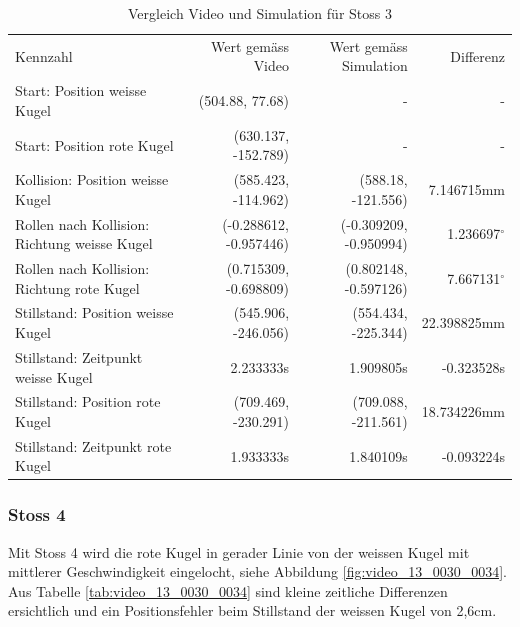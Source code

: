 \begin{table}[ht]
    \begin{tabular}{ lrrr }
        \rowcolor{\seccolor!50}
        Kennzahl & Wert gemäss Video & Wert gemäss Simulation & Differenz \\
        Start: Position weisse Kugel & (504.88, 77.68) & - & -\\
        Start: Position rote Kugel & (630.137, -152.789) & - & -\\
        Kollision: Position weisse Kugel & (585.423, -114.962) & (588.18, -121.556) & 7.146715mm\\
        Rollen nach Kollision: Richtung weisse Kugel & (-0.288612, -0.957446) & (-0.309209, -0.950994) & 1.236697$^{\circ}$ \\
        Rollen nach Kollision: Richtung rote Kugel & (0.715309, -0.698809) & (0.802148, -0.597126) & 7.667131$^{\circ}$ \\
        Stillstand: Position weisse Kugel & (545.906, -246.056) & (554.434, -225.344) & 22.398825mm\\
        Stillstand: Zeitpunkt weisse Kugel & 2.233333s & 1.909805s & -0.323528s\\
        Stillstand: Position rote Kugel & (709.469, -230.291) & (709.088, -211.561) & 18.734226mm\\
        Stillstand: Zeitpunkt rote Kugel & 1.933333s & 1.840109s & -0.093224s\\
    \end{tabular}
    \caption{Vergleich Video und Simulation für Stoss 3}
    \label{tab:video_12_0205_0208}
\end{table}

\newpage
\subsubsection{Stoss 4}
Mit Stoss 4 wird die rote Kugel in gerader Linie von der weissen Kugel mit mittlerer Geschwindigkeit eingelocht,
siehe Abbildung \ref{fig:video_13_0030_0034}.
Aus Tabelle \ref{tab:video_13_0030_0034} sind kleine zeitliche Differenzen ersichtlich und
ein Positionsfehler beim Stillstand der weissen Kugel von 2,6cm.

